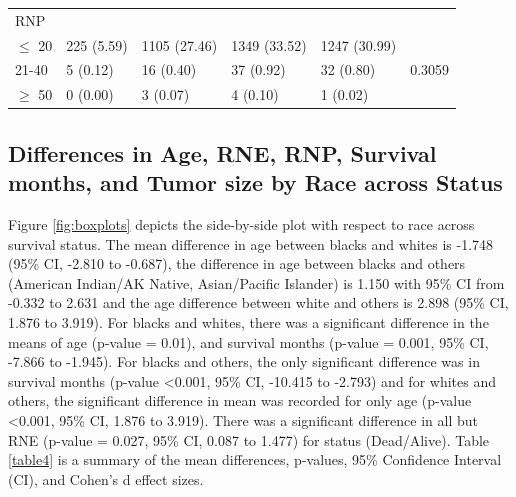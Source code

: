 \documentclass[times,sort&compress,3p]{elsarticle}
\theoremstyle{plain}
\theoremstyle{definition}
\begin{document}
\begin{table}[H]
\centering
\begin{tabular}{llllll} 
RNP              &                                                              &              &              &              &                    \\
$\leq$ 20             & 225 (5.59)                                                   & 1105 (27.46) & 1349 (33.52) & 1247 (30.99) &                    \\
21-40            & 5 (0.12)                                                     & 16 (0.40)    & 37 (0.92)    & 32 (0.80)    & 0.3059             \\
$\geq$ 50             & 0 (0.00)                                                     & 3 (0.07)     & 4 (0.10)     & 1 (0.02)     &     \\ \hline 
\hline 
\end{tabular}
\end{table}

\subsection{Differences in Age, RNE, RNP, Survival months, and Tumor size by Race across Status}
Figure \ref{fig:boxplots} depicts the side-by-side plot with respect to race across survival status. The mean difference in age between blacks and whites is -1.748 (95\% CI, -2.810 to -0.687), the difference in age between blacks and others (American Indian/AK Native, Asian/Pacific Islander) is 1.150 with 95\% CI from -0.332 to 2.631 and the age difference between white and others is 2.898 (95\% CI, 1.876 to 3.919). For blacks and whites, there was a significant difference in the means of age (p-value = 0.01), and survival months (p-value = 0.001, 95\% CI, -7.866 to -1.945). For blacks and others, the only significant difference was in survival months (p-value \textless 0.001, 95\% CI, -10.415 to -2.793) and for whites and others, the significant difference in mean was recorded for only age (p-value \textless 0.001, 95\% CI, 1.876 to 3.919). There was a significant difference in all but RNE (p-value = 0.027, 95\% CI, 0.087 to 1.477) for status (Dead/Alive). Table \ref{table4} is a summary of the mean differences, p-values, 95\% Confidence Interval (CI), and Cohen’s d effect sizes.
\end{document}
